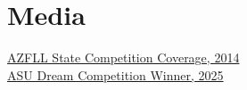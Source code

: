 \documentclass[10pt]{article}
\begin{document}
\section*{Media}
\href{https://theeagleangle.blogspot.com/2014/12/foothills-lego-robotics-team-wins-azfll.html}{AZFLL State Competition Coverage, 2014}\\
\href{https://www.linkedin.com/posts/school-of-manufacturing-systems-and-networks_asuengineering-design-robotics-activity-7324208506419453957-uM9B}{ASU Dream Competition Winner, 2025}
\end{document}
